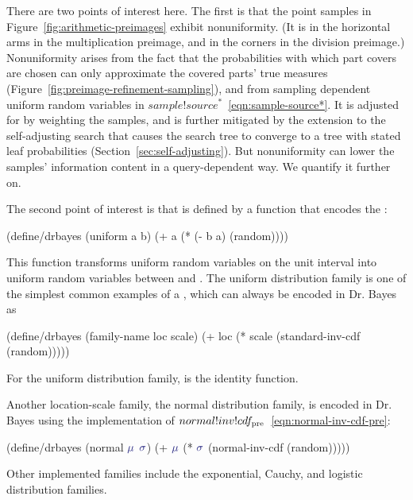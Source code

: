 There are two points of interest here.
The first is that the point samples in Figure~\ref{fig:arithmetic-preimages} exhibit nonuniformity.
(It is in the horizontal arms in the multiplication preimage, and in the corners in the division preimage.)
Nonuniformity arises from the fact that the probabilities with which part covers are chosen can only approximate the covered parts' true measures (Figure~\ref{fig:preimage-refinement-sampling}), and from sampling dependent uniform random variables in $sample!source^*$~\eqref{eqn:sample-source*}.
It is adjusted for by weighting the samples, and is further mitigated by the extension to the self-adjusting search that causes the search tree to converge to a tree with stated leaf probabilities (Section~\ref{sec:self-adjusting}).
But nonuniformity can lower the samples' information content in a query-dependent way.
We quantify it further on.

The second point of interest is that  is defined by a function that encodes the :
\begin{center}\singlespacing
\begin{schemedisplay}
(define/drbayes (uniform a b)
  (+ a (* (- b a) (random))))
\end{schemedisplay}
\end{center}
This function transforms uniform random variables on the unit interval into uniform random variables between  and .
The uniform distribution family is one of the simplest common examples of a , which can always be encoded in Dr. Bayes as
\begin{center}\singlespacing
\begin{schemedisplay}
(define/drbayes (family-name loc scale)
  (+ loc (* scale (standard-inv-cdf (random)))))
\end{schemedisplay}
\end{center}
For the uniform distribution family,  is the identity function.

Another location-scale family, the normal distribution family, is encoded in Dr. Bayes using the implementation of $normal!inv!cdf_\mathrm{pre}$~\eqref{eqn:normal-inv-cdf-pre}:
\begin{center}\singlespacing
\begin{schemedisplay}
(define/drbayes (normal $\va{\mu}$ $\va{\sigma}$)
  (+ $\va{\mu}$ (* $\va{\sigma}$ (normal-inv-cdf (random)))))
\end{schemedisplay}
\end{center}
Other implemented families include the exponential, Cauchy, and logistic distribution families.

